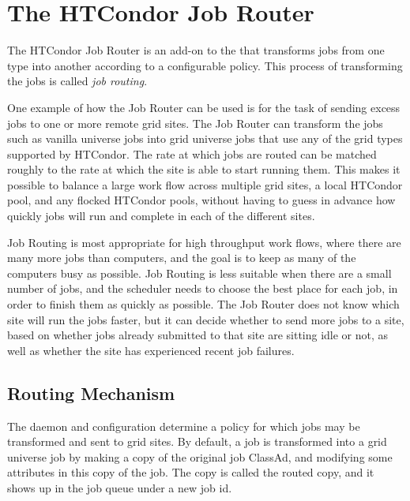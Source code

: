 \section{\label{sec:JobRouter}The HTCondor Job Router}

The HTCondor Job Router is an add-on to the  that transforms
jobs from one type into another according to a configurable policy.
This process of transforming the jobs is called \emph{job routing}.

One example of how the Job Router can be used is for the task of sending
excess jobs to one or more remote grid sites.
The Job Router can transform the jobs such as vanilla universe jobs into grid universe
jobs that use any of the grid types supported by HTCondor.  The rate at
which jobs are routed can be matched roughly to the rate at which the
site is able to start running them.  This makes it possible to balance
a large work flow across multiple grid sites, a local HTCondor pool, and
any flocked HTCondor pools, without having to guess in advance how quickly
jobs will run and complete in each of the different sites.

Job Routing is most appropriate for high throughput work flows, 
where there are many more jobs than computers,
and the goal is to keep as many of the computers busy as possible.
Job Routing is less suitable when there are a small number of jobs,
and the scheduler needs to choose the best place for each job,
in order to finish them as quickly as possible.
The Job Router does not know which site will run the jobs faster,
but it can decide whether to send more jobs to a site,
based on whether jobs already submitted to that site are
sitting idle or not, 
as well as whether the site has experienced recent job failures.

\subsection{\label{sec:RouterMechanism}Routing Mechanism}

The  daemon and configuration determine a policy
for which jobs may be transformed and sent to 
grid sites.
By default, a job is transformed into a grid universe job
by making a copy of the original job ClassAd, and
modifying some attributes in this copy of the job.
The copy is called the routed copy,
and it shows up in the job queue under a new job id.

